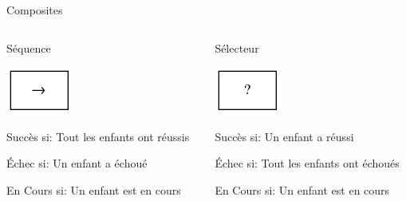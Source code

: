 \documentclass[presentation]{beamer}
\begin{document}
\begin{frame}[label=sec-2-1-2]{Composites}
\begin{columns}
\begin{column}{0.5\textwidth}

\begin{center}
\alert{Séquence}
\end{center}

\includegraphics[width=.9\linewidth]{img/Sequence.png}


Succès si:
Tout les enfants ont réussis

Échec si:
Un enfant a échoué

En Cours si:
Un enfant est en cours
\end{column}

\begin{column}{0.5\textwidth}

\begin{center}
\alert{Sélecteur}
\end{center}

\includegraphics[width=.9\linewidth]{img/Selector.png}


Succès si:
Un enfant a réussi

Échec si:
Tout les enfants ont échoués

En Cours si:
Un enfant est en cours
\end{column}
\end{columns}
\end{frame}
\end{document}
